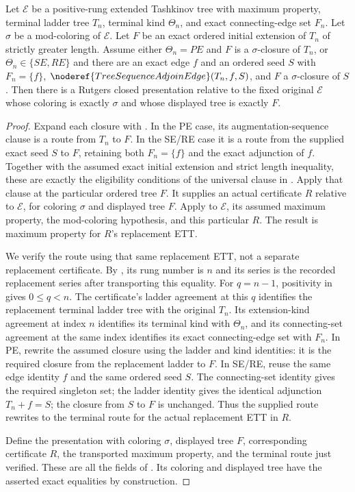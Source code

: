 \begin{lemma}
Let $\mathcal E$ be a positive-rung extended Tashkinov tree with maximum
property, terminal ladder tree $T_n$, terminal kind $\Theta_n$, and exact
connecting-edge set $F_n$. Let $\sigma$ be a mod-coloring of
$\mathcal E$. Let $F$ be an exact ordered initial extension of $T_n$ of
strictly greater length. Assume either $\Theta_n=PE$ and $F$ is a
$\sigma$-closure of $T_n$, or $\Theta_n\in\{SE,RE\}$ and there are an
exact edge $f$ and an ordered seed $S$ with $F_n=\{f\}$,
$\noderef{TreeSequenceAdjoinEdge}(T_n,f,S)$, and $F$ a $\sigma$-closure
of $S$. Then there is a Rutgers closed presentation relative to the
fixed original $\mathcal E$ whose coloring is exactly $\sigma$ and
whose displayed tree is exactly $F$.
\end{lemma}
\begin{proof}
Expand each closure with . In the PE case,
its augmentation-sequence clause is a route from $T_n$ to $F$.
In the SE/RE case it is a route from the supplied exact seed $S$ to
$F$, retaining both $F_n=\{f\}$ and the exact adjunction of $f$.
Together with the assumed exact initial extension and strict length
inequality, these are exactly the eligibility conditions of the universal
clause in . Apply that clause at the particular
ordered tree $F$. It supplies an actual
 certificate $R$ relative
to $\mathcal E$, for coloring $\sigma$ and displayed tree $F$.
Apply  to $\mathcal E$, its assumed
maximum property, the mod-coloring hypothesis, and this particular $R$.
The result is maximum property for $R$'s replacement ETT.

We verify the route using that same replacement ETT, not a separate
replacement certificate. By ,
its rung number is $n$ and its series is the recorded replacement series
after transporting this equality. For $q=n-1$, positivity in
 gives $0\leq q<n$. The certificate's
ladder agreement at this $q$ identifies the replacement terminal ladder
tree with the original $T_n$. Its extension-kind agreement at index $n$
identifies its terminal kind with $\Theta_n$, and its connecting-set
agreement at the same index identifies its exact connecting-edge set
with $F_n$. In PE, rewrite the assumed closure using the ladder and kind
identities: it is the required closure from the replacement ladder to
$F$. In SE/RE, reuse the same edge identity $f$ and the same ordered
seed $S$. The connecting-set identity gives the required singleton set;
the ladder identity gives the identical adjunction $T_n+f=S$; the
closure from $S$ to $F$ is unchanged. Thus the supplied route rewrites
to the terminal route for the actual replacement ETT in $R$.

Define the presentation with coloring $\sigma$, displayed tree $F$,
corresponding certificate $R$, the transported maximum property, and
the terminal route just verified. These are all the fields of
. Its coloring and displayed tree
have the asserted exact equalities by construction.
\end{proof}
